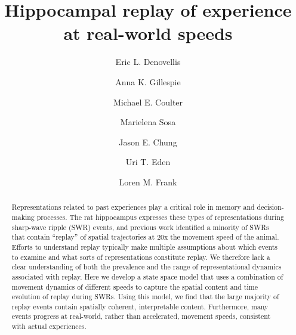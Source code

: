 \documentclass[9pt,lineno]{elife}
\begin{document}
\title{Hippocampal replay of experience at real-world speeds}

\author[1, 2, 3]{Eric L. Denovellis}
\author[2, 3]{Anna K. Gillespie}
\author[2, 3]{Michael E. Coulter}
\author[4]{Marielena Sosa}
\author[5]{Jason E. Chung}
\author[6]{Uri T. Eden}
\author[1, 2, 3]{Loren M. Frank}



\maketitle

\begin{abstract}
Representations related to past experiences play a critical role in memory and decision-making processes. The rat hippocampus expresses these types of representations during sharp-wave ripple (SWR) events, and previous work identified a minority of SWRs that contain “replay” of spatial trajectories at \texttildelow20x the movement speed of the animal. Efforts to understand replay typically make multiple assumptions about which events to examine and what sorts of representations constitute replay. We therefore lack a clear understanding of both the prevalence and the range of representational dynamics associated with replay. Here we develop a state space model that uses a combination of movement dynamics of different speeds to capture the spatial content and time evolution of replay during SWRs. Using this model, we find that the large majority of replay events contain spatially coherent, interpretable content. Furthermore, many events progress at real-world, rather than accelerated, movement speeds, consistent with actual experiences. 
\end {abstract}
\end{document}
